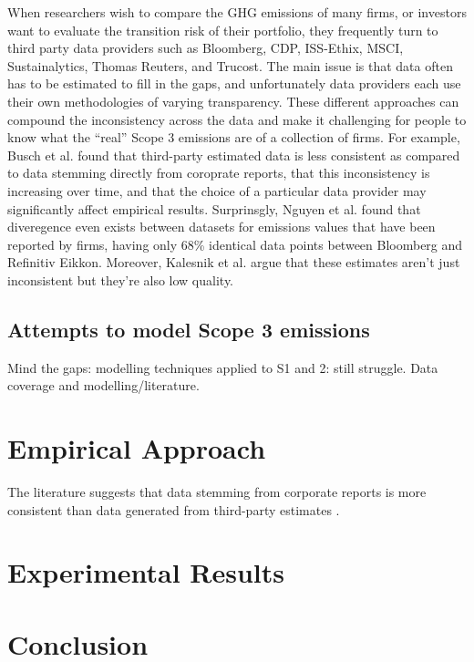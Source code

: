 \documentclass[12pt,twoside]{report}
\begin{document}
When researchers wish to compare the GHG emissions of many firms, or investors want to evaluate the transition risk of their portfolio, they frequently turn to third party data providers such as Bloomberg, CDP, ISS-Ethix, MSCI, Sustainalytics, Thomas Reuters, and Trucost.  The main issue is that data often has to be estimated to fill in the gaps, and unfortunately data providers each use their own methodologies of varying transparency. These different approaches can compound the inconsistency across the data and make it challenging for people to know what the ``real'' Scope 3 emissions are of a collection of firms. For example, Busch et al. \cite{Busch2022} found that third-party estimated data is less consistent as compared to data stemming directly from coroprate reports, that this inconsistency is increasing over time, and that the choice of a particular data provider may significantly affect empirical results. Surprinsgly, Nguyen et al. \cite{Nguyenetal2023} found that diveregence even exists between datasets for emissions values that have been reported by firms, having only 68\% identical data points between Bloomberg and Refinitiv Eikkon. Moreover, Kalesnik et al. \cite{KalesnikVitali2022} argue that these estimates aren't just inconsistent but they're also low quality. 

\section{Attempts to model Scope 3 emissions}\label{sec:Scope3Modelling}
Mind the gaps: modelling techniques applied to S1 and 2: still struggle. 
Data coverage and modelling/literature. 
\chapter{Empirical Approach}\label{sec:EmpiricalApproach}
The literature suggests that data stemming from corporate reports is more consistent than data generated from third-party estimates \cite{Busch2022}. 

\chapter{Experimental Results}


\chapter{Conclusion}




\end{document}
